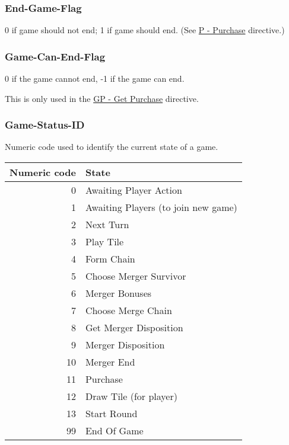 \documentclass{article}
\begin{document}

\subsubsection{End-Game-Flag} %
\label{ssub:end_game_flag}

0 if game should not end; 1 if game should end. (See \hyperref[ssub:p_purchase]{P - Purchase} directive.)


\subsubsection{Game-Can-End-Flag} %
\label{ssub:game_can_end_flag}

0 if the game cannot end, -1 if the game can end.

This is only used in the \hyperref[ssub:gp_get_purchase]{GP - Get Purchase} directive.


\subsubsection{Game-Status-ID} %
\label{ssub:game_status_id}

Numeric code used to identify the current state of a game.

\begin{tabular}{r|l}
  Numeric code & State                                \\
  \hline
             0 & Awaiting Player Action               \\
             1 & Awaiting Players (to join new game)  \\
             2 & Next Turn                            \\
             3 & Play Tile                            \\
             4 & Form Chain                           \\
             5 & Choose Merger Survivor               \\
             6 & Merger Bonuses                       \\
             7 & Choose Merge Chain                   \\
             8 & Get Merger Disposition               \\
             9 & Merger Disposition                   \\
            10 & Merger End                           \\
            11 & Purchase                             \\
            12 & Draw Tile (for player)               \\
            13 & Start Round                          \\
            99 & End Of Game
\end{tabular}
\end{document}
